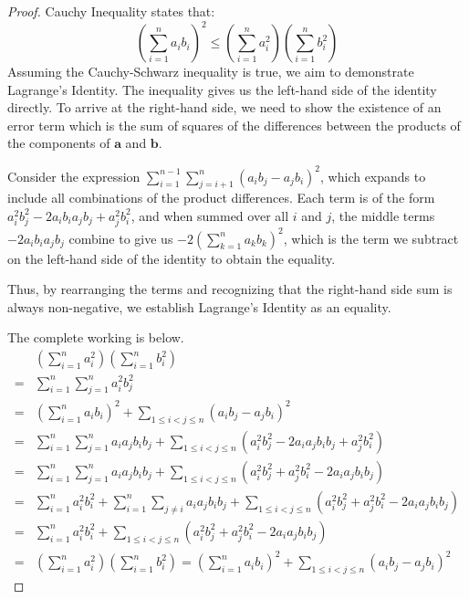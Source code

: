     \begin{proof}
    Cauchy Inequality states that: $$\left(\sum_{i=1}^{n} a_{i} b_{i}\right)^{2} \leq\left(\sum_{i=1}^{n} a_{i}^{2}\right)\left(\sum_{i=1}^{n} b_{i}^{2}\right)$$
    Assuming the Cauchy-Schwarz inequality is true, we aim to demonstrate Lagrange's Identity. The inequality gives us the left-hand side of the identity directly. To arrive at the right-hand side, we need to show the existence of an error term which is the sum of squares of the differences between the products of the components of \( \mathbf{a} \) and \( \mathbf{b} \).

Consider the expression \( \sum_{i=1}^{n-1} \sum_{j=i+1}^{n} (a_i b_j - a_j b_i)^2 \), which expands to include all combinations of the product differences. Each term is of the form \( a_i^2 b_j^2 - 2 a_i b_i a_j b_j + a_j^2 b_i^2 \), and when summed over all \( i \) and \( j \), the middle terms \( -2 a_i b_i a_j b_j \) combine to give us \( -2 \left( \sum_{k=1}^{n} a_k b_k \right)^2 \), which is the term we subtract on the left-hand side of the identity to obtain the equality.

Thus, by rearranging the terms and recognizing that the right-hand side sum is always non-negative, we establish Lagrange's Identity as an equality.

The complete working is below.
    \begin{align*}
    &\left( \sum_{i=1}^{n} a_i^2 \right) \left( \sum_{i=1}^{n} b_i^2 \right) \\
    =& \sum_{i=1}^{n} \sum_{j=1}^{n} a_i^2 b_j^2 \\
    =& \left( \sum_{i=1}^{n} a_i b_i \right)^2 + \sum_{1 \leq i < j \leq n} (a_i b_j - a_j b_i)^2 \\
    =& \sum_{i=1}^{n} \sum_{j=1}^{n} a_i a_j b_i b_j + \sum_{1 \leq i < j \leq n} (a_i^2 b_j^2 - 2a_i a_j b_i b_j + a_j^2 b_i^2) \\
    =& \sum_{i=1}^{n} \sum_{j=1}^{n} a_i a_j b_i b_j + \sum_{1 \leq i < j \leq n} (a_i^2 b_j^2 + a_j^2 b_i^2 - 2a_i a_j b_i b_j) \\
    =& \sum_{i=1}^{n} a_i^2 b_i^2 + \sum_{i=1}^{n} \sum_{j \neq i} a_i a_j b_i b_j + \sum_{1 \leq i < j \leq n} (a_i^2 b_j^2 + a_j^2 b_i^2 - 2a_i a_j b_i b_j) \\
    =& \sum_{i=1}^{n} a_i^2 b_i^2 + \sum_{1 \leq i < j \leq n} (a_i^2 b_j^2 + a_j^2 b_i^2 - 2a_i a_j b_i b_j) \\
    =& \left( \sum_{i=1}^{n} a_i^2 \right) \left( \sum_{i=1}^{n} b_i^2 \right) = \left( \sum_{i=1}^{n} a_i b_i \right)^2 + \sum_{1 \leq i < j \leq n} (a_i b_j - a_j b_i)^2 
    \end{align*}
\end{proof}

